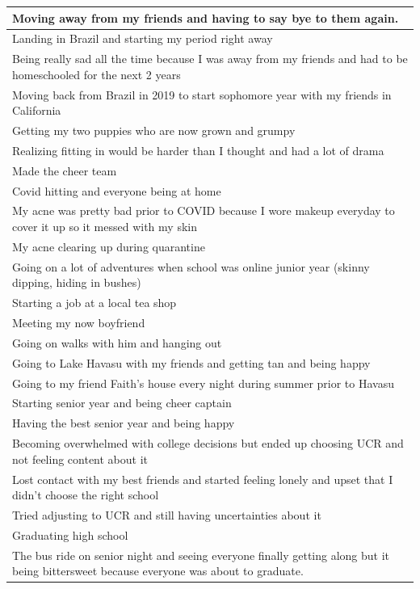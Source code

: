 \documentclass[
  .7em,
  letterpaper,
  DIV=11,
  numbers=noendperiod]{scrartcl}
\begin{document}
\begin{table}
\begin{tabular}{l}
\hline
Moving away from my friends and having to say bye to them again.\\
\hline
Landing in Brazil and starting my period right away\\
\hline
Being really sad all the time because I was away from my friends and had to be homeschooled for the next 2 years\\
\hline
Moving back from Brazil in 2019 to start sophomore year with my friends in California\\
\hline
Getting my two puppies who are now grown and grumpy\\
\hline
Realizing fitting in would be harder than I thought and had a lot of drama\\
\hline
Made the cheer team\\
\hline
Covid hitting and everyone being at home\\
\hline
My acne was pretty bad prior to COVID because I wore makeup everyday to cover it up so it messed with my skin\\
\hline
My acne clearing up during quarantine\\
\hline
Going on a lot of adventures when school was online junior year (skinny dipping, hiding in bushes)\\
\hline
Starting a job at a local tea shop\\
\hline
Meeting my now boyfriend\\
\hline
Going on walks with him and hanging out\\
\hline
Going to Lake Havasu with my friends and getting tan and being happy\\
\hline
Going to my friend Faith's house every night during summer prior to Havasu\\
\hline
Starting senior year and being cheer captain\\
\hline
Having the best senior year and being happy\\
\hline
Becoming overwhelmed with college decisions but ended up choosing UCR and not feeling content about it\\
\hline
Lost contact with my best friends and started feeling lonely and upset that I didn't choose the right school\\
\hline
Tried adjusting to UCR and still having uncertainties about it\\
\hline
Graduating high school\\
\hline
The bus ride on senior night and seeing everyone finally getting along but it being bittersweet because everyone was about to graduate.\\

\end{tabular}
\end{table}
\end{document}
